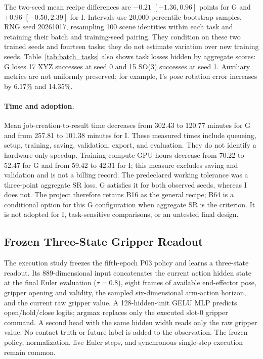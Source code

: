 The two-seed mean recipe differences are $-0.21$ $[-1.36,0.96]$ points
for G and $+0.96$ $[-0.50,2.39]$ for I. Intervals use 20,000 percentile
bootstrap samples, RNG seed 20261017, resampling 100 scene identities within
each task and retaining their batch and training-seed pairing. They condition
on these two trained seeds and fourteen tasks; they do not estimate variation
over new training seeds. Table~\ref{tab:batch_tasks} also shows task losses
hidden by aggregate scores: G loses 17 XYZ successes at seed 0 and 15 SO(3)
successes at seed 1. Auxiliary metrics are not uniformly preserved; for
example, I's pose rotation error increases by 6.17\% and 14.35\%.

\paragraph{Time and adoption.}
Mean job-creation-to-result time decreases from 302.43 to 120.77 minutes
for G and from 257.81 to 101.38 minutes for I. These measured times include
queueing, setup, training, saving, validation, export, and evaluation.
They do not identify a hardware-only speedup. Training-compute GPU-hours
decrease from 70.22 to 52.47 for G and from 59.42 to 42.31 for I;
this measure excludes saving and validation and is not a billing record.
The predeclared working tolerance was a three-point aggregate SR loss.
G satisfies it for both observed seeds, whereas I does not. The project
therefore retains B16 as the general recipe; B64 is a conditional option
for this G configuration when aggregate SR is the criterion. It is not
adopted for I, task-sensitive comparisons, or an untested final design.

\subsection{Frozen Three-State Gripper Readout}
\label{app:learned_decoder}
The execution study freezes the fifth-epoch P03 policy and learns a
three-state readout. Its 889-dimensional input concatenates the current
action hidden state at the final Euler evaluation ($\tau=0.8$), eight
frames of available end-effector pose, gripper opening and validity,
the sampled six-dimensional arm-action horizon, and the current raw gripper
value. A 128-hidden-unit GELU MLP predicts open/hold/close logits; argmax
replaces only the executed slot-0 gripper command. A second head with the
same hidden width reads only the raw gripper value. No contact truth or
future label is added to the observation. The frozen policy, normalization,
five Euler steps, and synchronous single-step execution remain common.

